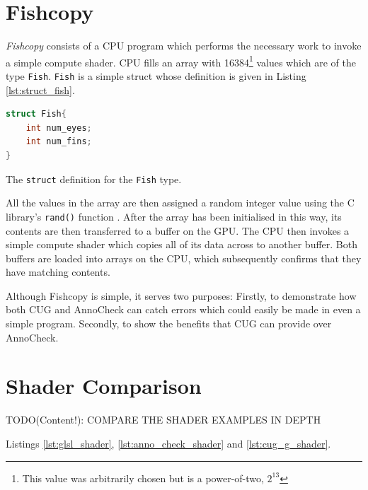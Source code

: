\documentclass[a4paper,12pt,twoside,openright]{report}
\begin{document}
\section{Fishcopy}

\textit{Fishcopy} consists of a CPU program which performs the necessary work
to invoke a simple compute shader. CPU fills an array with 16384\footnote{This
value was arbitrarily chosen but is a power-of-two, $2^{13}$} values which are
of the type \texttt{Fish}. \texttt{Fish} is a simple struct whose definition is
given in Listing \ref{lst:struct_fish}.

\begin{lstfloat}
\begin{lstlisting}[language=C]
struct Fish{
    int num_eyes;
    int num_fins;
}
\end{lstlisting}
\caption{The \texttt{struct} definition for the \texttt{Fish} type.}
\label{lst:struct_fish}
\end{lstfloat}

% 

All the values in the array are then assigned a random integer value using the
C library's \texttt{rand()} function \cite{RandRef}. After the array has been
initialised in this way, its contents are then transferred to a buffer on the
GPU. The CPU then invokes a simple compute shader which copies all of its data
across to another buffer. Both buffers are loaded into arrays on the CPU, which
subsequently confirms that they have matching contents.

Although Fishcopy is simple, it serves two purposes: Firstly, to demonstrate
how both CUG and AnnoCheck can catch errors which could easily be made in even
a simple program. Secondly, to show the benefits that CUG can provide over
AnnoCheck.

\section{Shader Comparison}

\label{sec:shader_comparison}

TODO(Content!): COMPARE THE SHADER EXAMPLES IN DEPTH

Listings \ref{lst:glsl_shader}, \ref{lst:anno_check_shader} and
\ref{lst:cug_g_shader}.
\end{document}
